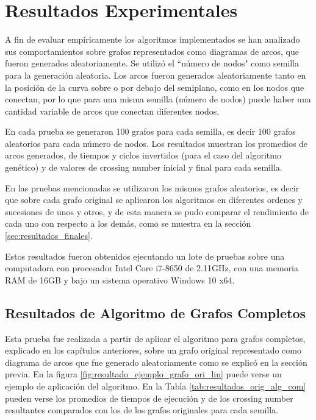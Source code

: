 \chapter{Resultados Experimentales}\label{cap5}
A fin de evaluar empíricamente los algoritmos implementados se han analizado sus comportamientos sobre grafos representados como diagramas de arcos, que fueron generados aleatoriamente. Se utilizó el ``número de nodos" como semilla para la generación aleatoria. Los arcos fueron generados aleatoriamente tanto en la posición de la curva sobre o por debajo del semiplano, como en los nodos que conectan, por lo que para una misma semilla (número de nodos) puede haber una cantidad variable de arcos que conectan diferentes nodos. 

En cada prueba se generaron 100 grafos para cada semilla, es decir 100 grafos aleatorios para cada número de nodos. Los resultados muestran los promedios de arcos generados, de tiempos y ciclos invertidos (para el caso del algoritmo genético) y de valores de crossing number inicial y final para cada semilla. 

En las pruebas mencionadas se utilizaron los mismos grafos aleatorios, es decir que sobre cada grafo original se aplicaron los algoritmos en diferentes ordenes y sucesiones de unos y otros, y de esta manera se pudo comparar el rendimiento de cada uno con respecto a los demás, como se muestra en la sección \ref{sec:resultados_finales}.

Estos resultados fueron obtenidos ejecutando un lote de pruebas sobre una computadora con procesador Intel Core i7-8650 de 2.11GHz, con una memoria RAM de 16GB y bajo un sistema operativo Windows 10 x64.

\section{Resultados de Algoritmo de Grafos Completos}
Esta prueba fue realizada a partir de aplicar el algoritmo para grafos completos, explicado en los capítulos anteriores, sobre un grafo original representado como diagrama de arcos que fue generado aleatoriamente como se explicó en la sección previa. En la figura \ref{fig:resultado_ejemplo_grafo_ori_lin} puede verse un ejemplo de aplicación del algoritmo. En la Tabla \ref{tab:resultados_orig_alg_com} pueden verse los promedios de tiempos de ejecución y de los crossing number resultantes comparados con los de los grafos originales para cada semilla.

